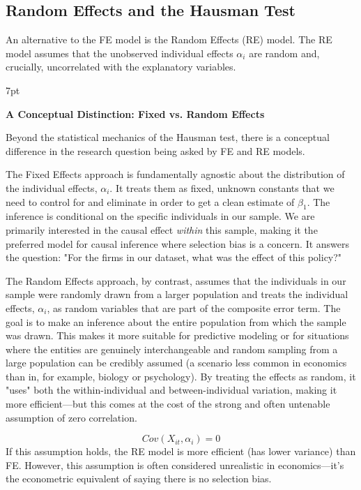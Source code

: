 \documentclass{article}
\newenvironment{greenblock}{%
\def\FrameCommand{%
  \hspace{1pt}%
    {\color{Green}%
    \vrule width 2pt}%
    {\color{greenshade}%
    \vrule width 4pt}%
  \colorbox{greenshade}%
}%
\MakeFramed{%
  \advance%
  \hsize-%
  \width%
  \FrameRestore}%
\noindent\hspace{-4.55pt}%
\begin{adjustwidth}{}{7pt}%
\vspace{2pt}\vspace{2pt}%
}
{%
\vspace{2pt}\end{adjustwidth}\endMakeFramed%
}
\begin{document}
\subsection{Random Effects and the Hausman Test}
\label{sub:random_effects}

An alternative to the FE model is the Random Effects (RE) model. The RE model assumes that the unobserved individual effects $\alpha_i$ are random and, crucially, 
uncorrelated with the explanatory variables.

\begin{greenblock}
\textbf{A Conceptual Distinction: Fixed vs. Random Effects}

Beyond the statistical mechanics of the Hausman test, there is a conceptual difference in the research question being asked by FE and RE models.

The Fixed Effects approach is fundamentally agnostic about the distribution of the individual effects, $\alpha_i$. It treats them as fixed, unknown constants that we need to control for and eliminate in order to get a clean estimate of $\beta_1$. The inference is conditional on the specific individuals in our sample. We are primarily interested in the causal effect \textit{within} this sample, making it the preferred model for causal inference where selection bias is a concern. It answers the question: "For the firms in our dataset, what was the effect of this policy?"

The Random Effects approach, by contrast, assumes that the individuals in our sample were randomly drawn from a larger population and treats the individual effects, $\alpha_i$, as random variables that are part of the composite error term. The goal is to make an inference about the entire population from which the sample was drawn. This makes it more suitable for predictive modeling or for situations where the entities are genuinely interchangeable and random sampling from a large population can be credibly assumed (a scenario less common in economics than in, for example, biology or psychology). By treating the effects as random, it "uses" both the within-individual and between-individual variation, making it more efficient—but this comes at the cost of the strong and often untenable assumption of zero correlation.

\end{greenblock}


\begin{equation}
    Cov(X_{it}, \alpha_i) = 0
\end{equation}
If this assumption holds, the RE model is more efficient (has lower variance) than FE. However, this assumption is often considered unrealistic in economics—it's the econometric equivalent of saying there is no selection bias.
\end{document}
